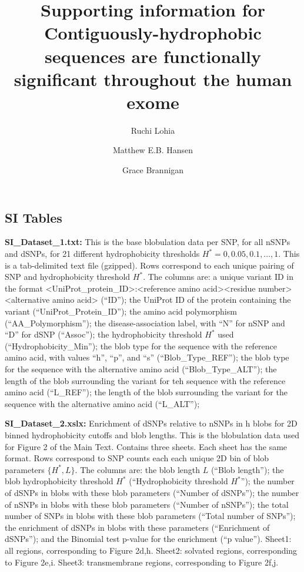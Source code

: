 \documentclass[9pt,lineno]{elife}
\title{Supporting information for Contiguously-hydrophobic sequences are functionally significant throughout the human exome}
\author[1\authfn{3}]{Ruchi Lohia}
\author[2\authfn{1}]{Matthew E.B. Hansen}
\author[1,3\authfn{1}*]{Grace Brannigan}
\affil[1]{Center for Computational and Integrative Biology, Rutgers University, Camden, NJ, USA}
\affil[2]{Department of Genetics, University of Pennsylvania, Philadelphia, PA, USA}
\affil[3]{Department of Physics, Rutgers University, Camden, NJ, USA}
\begin{document}
\renewcommand{\thepage}{S\arabic{page}}  
\renewcommand{\thesection}{S\arabic{section}}   
\renewcommand{\thetable}{S\arabic{table}}   
\renewcommand{\figurename}{}
\renewcommand{\thefigure}{Fig S\arabic{figure}}

\maketitle
   
\subsection*{SI Tables}

\textbf{SI_Dataset_1.txt:} This is the base blobulation data per SNP, for all nSNPs and dSNPs, for 21 different hydrophobicity thresholds $H^*=0,0.05,0.1,\dots,1$. This is a tab-delimited text file (gzipped). Rows correspond to each unique pairing of SNP and hydrophobicity threshold $H^*$. The columns are: a unique variant ID in the format <UniProt_protein_ID>:<reference amino acid><residue number><alternative amino acid> (``ID''); the UniProt ID of the protein containing the variant (``UniProt_Protein_ID''); the amino acid polymorphism (``AA_Polymorphism''); the disease-association label, with ``N'' for nSNP and ``D'' for dSNP (``Assoc''); the hydrophobicity threshold $H^*$ used (``Hydrophobicity_Min''); the blob type for the sequence with the reference amino acid, with values ``h'', ``p'', and ``s'' (``Blob_Type_REF''); the blob type for the sequence with the alternative amino acid (``Blob_Type_ALT''); the length of the blob surrounding the variant for teh sequence with the reference amino acid (``L_REF''); the length of the blob surrounding the variant for the sequence with the alternative amino acid (``L_ALT''); 
\hfill

\textbf{SI_Dataset_2.xslx:} Enrichment of dSNPs relative to nSNPs in h blobs for 2D binned hydrophobicity cutoffs and blob lengths. This is the blobulation data used for Figure 2 of the Main Text. Contains three sheets. Each sheet has the same format. Rows correspond to SNP counts each each unique 2D bin of blob parameters $\{H^*,L\}$. The columns are: the blob length $L$ (``Blob length''); the blob hydrophobicity threshold $H^*$ (``Hydrophobicity threshold $H^*$''); the number of dSNPs in blobs with these blob parameters (``Number of dSNPs''); the number of nSNPs in blobs with these blob parameters (``Number of nSNPs''); the total number of SNPs in blobs with these blob parameters (``Total number of SNPs''); the enrichment of dSNPs in blobs with these parameters (``Enrichment of dSNPs''); and the Binomial test p-value for the enrichment (``p value''). Sheet1: all regions, corresponding to Figure 2d,h. Sheet2: solvated regions, corresponding to Figure 2e,i. Sheet3: transmembrane regions, corresponding to Figure 2f,j. 
\hfill
\end{document}
